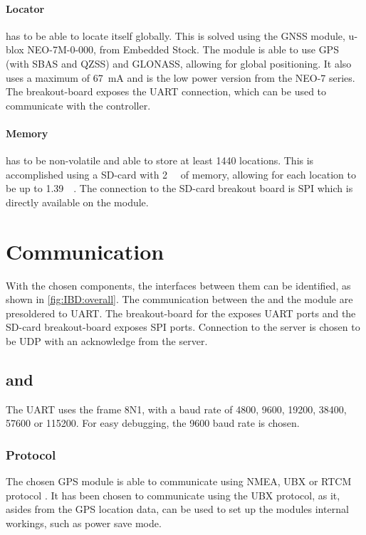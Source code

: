 \paragraph{Locator} has to be able to locate itself globally. This is solved using the GNSS module, u-blox NEO-7M-0-000, from Embedded Stock.
The module is able to use GPS (with SBAS and QZSS) and GLONASS, allowing for global positioning.
It also uses a maximum of \SI{67}{\milli\ampere} \cite[p.~17]{NEO7_Data} and is the low power version from the NEO-7 series.
The breakout-board exposes the UART connection, which can be used to communicate with the controller.

\paragraph{Memory} has to be non-volatile and able to store at least 1440 locations.
This is accomplished using a SD-card with \SI{2}{\giga\byte} of memory, allowing for each location to be up to \SI{1.39}{\mega\byte}.
The connection to the \SDsock SD-card breakout board\cite{Ciseco} is SPI which is directly available on the \MKR module.

\section{Communication}
With the chosen components, the interfaces between them can be identified, as shown in \cref{fig:IBD:overall}.
The communication between the \SAMD and the \SARA module are presoldered to UART.
The breakout-board for the \GPS exposes UART ports and the SD-card breakout-board exposes SPI ports.
Connection to the server is chosen to be UDP with an acknowledge from the server.

\subsection{\MKR and \GPS}
The \GPS UART uses the frame 8N1, with a baud rate of \num{4800}, \num{9600}, \num{19200}, \num{38400}, \num{57600} or \num{115200}.
For easy debugging, the \num{9600} baud rate is chosen.

\subsubsection{Protocol}
The chosen GPS module is able to communicate using NMEA, UBX or RTCM protocol \cite{NEO7_proto}.
It has been chosen to communicate using the UBX protocol, as it, asides from the GPS location data, can be used to set up the modules internal workings, such as power save mode.


